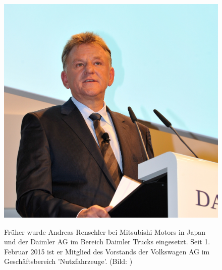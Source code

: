 \documentclass[12pt]{article}
\begin{document}
\begin{figure}[here!]
	\centering
	\begin{minipage}[h]{0.20\textwidth}
		\centering
		\includegraphics[width=1.0\textwidth]{images/AndreasRenschler.jpg}
		\label{fig:vorstandvw6}
	\end{minipage}
	\begin{minipage}[h]{0.10\textwidth}
		\hspace{1cm} 
	\end{minipage}
	\begin{minipage}[h]{0.65\textwidth}
		Früher wurde Andreas Renschler bei Mitsubishi Motors in Japan und der Daimler AG im Bereich Daimler Trucks eingesetzt. Seit 1. Februar 2015 ist er Mitglied des Vorstands der Volkswagen AG im Geschäftsbereich 'Nutzfahrzeuge'. (Bild: \cite{arpic} )
	\end{minipage}
\end{figure}
\end{document}
